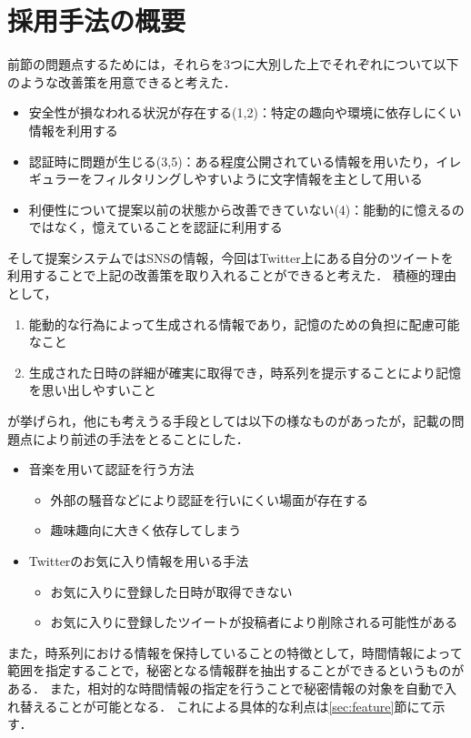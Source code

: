 \section{採用手法の概要}
前節の問題点するためには，それらを3つに大別した上でそれぞれについて以下のような改善策を用意できると考えた．
\begin{itemize}
  \item 安全性が損なわれる状況が存在する(1,2)：特定の趣向や環境に依存しにくい情報を利用する
  \item 認証時に問題が生じる(3,5)：ある程度公開されている情報を用いたり，イレギュラーをフィルタリングしやすいように文字情報を主として用いる
  \item 利便性について提案以前の状態から改善できていない(4)：能動的に憶えるのではなく，憶えていることを認証に利用する
\end{itemize}
そして提案システムではSNSの情報，今回はTwitter上にある自分のツイートを利用することで上記の改善策を取り入れることができると考えた．
積極的理由として，
\begin{enumerate}
\item 能動的な行為によって生成される情報であり，記憶のための負担に配慮可能なこと
\item 生成された日時の詳細が確実に取得でき，時系列を提示することにより記憶を思い出しやすいこと
\end{enumerate}
が挙げられ，他にも考えうる手段としては以下の様なものがあったが，記載の問題点により前述の手法をとることにした．
\begin{itemize}
  \item 音楽を用いて認証を行う方法
  \begin{itemize}
    \item 外部の騒音などにより認証を行いにくい場面が存在する
    \item 趣味趣向に大きく依存してしまう
  \end{itemize}
  \item Twitterのお気に入り情報を用いる手法
  \begin{itemize}
    \item お気に入りに登録した日時が取得できない
    \item お気に入りに登録したツイートが投稿者により削除される可能性がある
  \end{itemize}
\end{itemize}

また，時系列における情報を保持していることの特徴として，時間情報によって範囲を指定することで，秘密となる情報群を抽出することができるというものがある．
また，相対的な時間情報の指定を行うことで秘密情報の対象を自動で入れ替えることが可能となる．
これによる具体的な利点は\ref{sec:feature}節にて示す．

